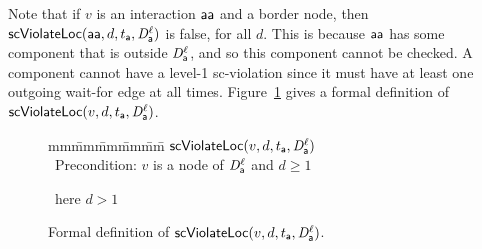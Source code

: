 \ee
\ed
%
Note that if $v$ is an interaction $\mathsf{aa}$ and a border node, then
$\mathsf{scViolateLoc}(\mathsf{aa},d,t_{\mathsf{a}},\mathit{D}_{\mathsf{a}}^{\ell})$ is false, for all $d$.  This is because $\mathsf{aa}$ has some
component that is outside $\mathit{D}_{\mathsf{a}}^{\ell}$, and so this component cannot be checked.  A component
cannot have a level-1 sc-violation since it must
have at least one outgoing wait-for edge at all times.
%
Figure~\ref{fig:scViolateLoc} gives a formal definition of $\mathsf{scViolateLoc}(v,d,t_{\mathsf{a}},\mathit{D}_{\mathsf{a}}^{\ell})$.



 
\begin{figure}[ht]
\setcounter{lctr}{0}
\begin{tabbing}
mm\= mm\= mm\= mm\= mm\=\kill
$\mathsf{scViolateLoc}(v,d,t_{\mathsf{a}},\mathit{D}_{\mathsf{a}}^{\ell})$\\
\cmnt\ Precondition: $v$ is a node of $\mathit{D}_{\mathsf{a}}^{\ell}$ and $d \ge 1$\\

       \lit{\ELSE\ \RETURNE{\fff}}
       \lit{\FI}

\cmnt\ here $d > 1$\\

        \lit{\RETURNE{\ttt}}

      \lit{\RETURNE{\ttt}}


\lio{\ELSE\ \RETURNE{\fff}}
\end{tabbing}
\caption{Formal definition of $\mathsf{scViolateLoc}(v,d,t_{\mathsf{a}},\mathit{D}_{\mathsf{a}}^{\ell})$.}
\label{fig:scViolateLoc}
\end{figure}



